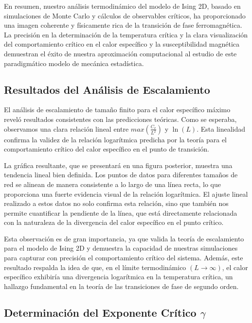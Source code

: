 \documentclass[twocolumn]{article}
\begin{document}
En resumen, nuestro análisis termodinámico del modelo de Ising 2D, basado en simulaciones de Monte Carlo y cálculos de observables críticos, ha proporcionado una imagen coherente y físicamente rica de la transición de fase ferromagnética. La precisión en la determinación de la temperatura crítica y la clara visualización del comportamiento crítico en el calor específico y la susceptibilidad magnética demuestran el éxito de nuestra aproximación computacional al estudio de este paradigmático modelo de mecánica estadística.

\subsection*{Resultados del Análisis de Escalamiento}

El análisis de escalamiento de tamaño finito para el calor específico máximo reveló resultados consistentes con las predicciones teóricas. Como se esperaba, observamos una clara relación lineal entre $max(\frac{C_v}{L^2})$ y $\ln(L)$. Esta linealidad confirma la validez de la relación logarítmica predicha por la teoría para el comportamiento crítico del calor específico en el punto de transición.

La gráfica resultante, que se presentará en una figura posterior, muestra una tendencia lineal bien definida. Los puntos de datos para diferentes tamaños de red se alinean de manera consistente a lo largo de una línea recta, lo que proporciona una fuerte evidencia visual de la relación logarítmica. El ajuste lineal realizado a estos datos no solo confirma esta relación, sino que también nos permite cuantificar la pendiente de la línea, que está directamente relacionada con la naturaleza de la divergencia del calor específico en el punto crítico.

Esta observación es de gran importancia, ya que valida la teoría de escalamiento para el modelo de Ising 2D y demuestra la capacidad de nuestras simulaciones para capturar con precisión el comportamiento crítico del sistema. Además, este resultado respalda la idea de que, en el límite termodinámico $(L \to \infty)$, el calor específico exhibiría una divergencia logarítmica en la temperatura crítica, un hallazgo fundamental en la teoría de las transiciones de fase de segundo orden.


\subsection*{Determinación del Exponente Crítico $\gamma$}
\end{document}
